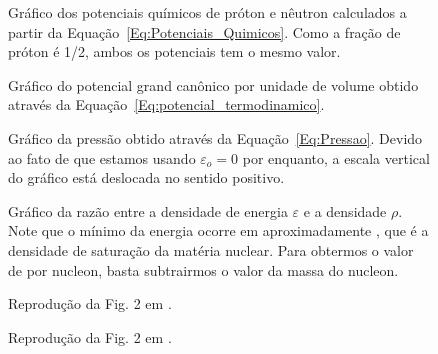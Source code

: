 \begin{figure}
	
	\caption{Gráfico dos potenciais químicos de próton e nêutron calculados a partir da Equação~\eqref{Eq:Potenciais_Quimicos}. Como a fração de próton é 1/2, ambos os potenciais tem o mesmo valor. \protect}
	\label{Fig:chemical_potential_graph_eNJL1m}
\end{figure}

\FloatBarrier

\begin{figure}
	
	\caption{Gráfico do potencial grand canônico por unidade de volume obtido através da Equação~\eqref{Eq:potencial_termodinamico}. \protect}
	\label{Fig:thermodynamic_potential_graph_eNJL1m}
\end{figure}

\begin{figure}
	
	\caption{Gráfico da pressão obtido através da Equação~\eqref{Eq:Pressao}. Devido ao fato de que estamos usando $\varepsilon_o = 0$ por enquanto, a escala vertical do gráfico está deslocada no sentido positivo. \protect}
	\label{Fig:pressure_graph_eNJL1m}
\end{figure}

\begin{figure}
	
	\caption{Gráfico da razão entre a densidade de energia $\varepsilon$ e a densidade $\rho$. Note que o mínimo da energia ocorre em aproximadamente , que é a densidade de saturação da matéria nuclear. Para obtermos o valor de  por nucleon, basta subtrairmos o valor da massa do nucleon. \protect}
	\label{Fig:energy_by_nucleon_graph_eNJL1m}
\end{figure}

\begin{figure}
	
	\caption{Reprodução da Fig. 2 em \textcite{Pais}.}
	\label{Fig:Rep_Pais_Mass}
\end{figure}

\begin{figure}
	
	\caption{Reprodução da Fig. 2 em \textcite{Pais}.}
	\label{Fig:Rep_Pais_Pressure}
\end{figure}

